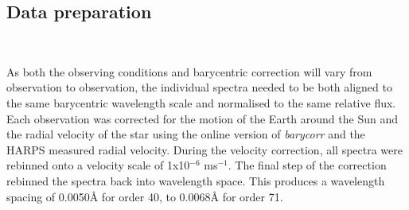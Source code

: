 \subsection{Data preparation}
\label{secISVdataprep}
\begin{figure}
    \centering
	\captionsetup{width=.8\textwidth}
	\\
    \caption{}
    \label{figISV_A}
\end{figure}

As both the observing conditions and barycentric correction will vary from observation to observation, the individual spectra needed to be both aligned to the same barycentric wavelength scale and normalised to the same relative flux. Each observation was corrected for the motion of the Earth around the Sun and the radial velocity of the star using the online version of \textit{barycorr} \citep{2014Wright} and the HARPS measured radial velocity.  During the velocity correction, all spectra were rebinned onto a velocity scale of 1x10$^{-6}$ ms$^{-1}$. The final step of the correction rebinned the spectra back into wavelength space. This produces a wavelength spacing of 0.0050\hbox{\AA} for order 40, to 0.0068\hbox{\AA} for order 71.\\

